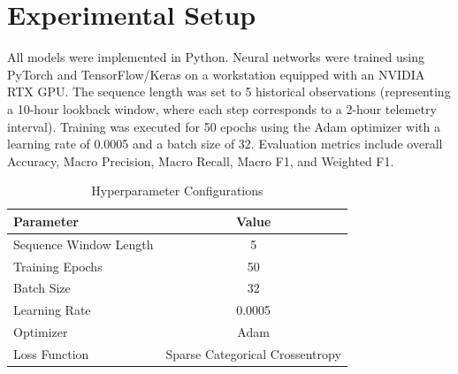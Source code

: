 \section{Experimental Setup}
All models were implemented in Python. Neural networks were trained using PyTorch and TensorFlow/Keras on a workstation equipped with an NVIDIA RTX GPU. The sequence length was set to 5 historical observations (representing a 10-hour lookback window, where each step corresponds to a 2-hour telemetry interval). Training was executed for 50 epochs using the Adam optimizer with a learning rate of 0.0005 and a batch size of 32. Evaluation metrics include overall Accuracy, Macro Precision, Macro Recall, Macro F1, and Weighted F1.

\begin{table}[htbp]
\caption{Hyperparameter Configurations}
\centering
\begin{tabular}{lc}
\toprule
\textbf{Parameter} & \textbf{Value} \\
\midrule
Sequence Window Length & 5 \\
Training Epochs & 50 \\
Batch Size & 32 \\
Learning Rate & 0.0005 \\
Optimizer & Adam \\
Loss Function & Sparse Categorical Crossentropy \\
\bottomrule
\end{tabular}
\label{tab:hyper}
\end{table}
